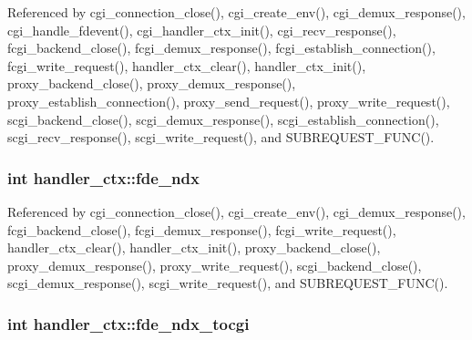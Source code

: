 Referenced by cgi\-\_\-connection\-\_\-close(), cgi\-\_\-create\-\_\-env(), cgi\-\_\-demux\-\_\-response(), cgi\-\_\-handle\-\_\-fdevent(), cgi\-\_\-handler\-\_\-ctx\-\_\-init(), cgi\-\_\-recv\-\_\-response(), fcgi\-\_\-backend\-\_\-close(), fcgi\-\_\-demux\-\_\-response(), fcgi\-\_\-establish\-\_\-connection(), fcgi\-\_\-write\-\_\-request(), handler\-\_\-ctx\-\_\-clear(), handler\-\_\-ctx\-\_\-init(), proxy\-\_\-backend\-\_\-close(), proxy\-\_\-demux\-\_\-response(), proxy\-\_\-establish\-\_\-connection(), proxy\-\_\-send\-\_\-request(), proxy\-\_\-write\-\_\-request(), scgi\-\_\-backend\-\_\-close(), scgi\-\_\-demux\-\_\-response(), scgi\-\_\-establish\-\_\-connection(), scgi\-\_\-recv\-\_\-response(), scgi\-\_\-write\-\_\-request(), and S\-U\-B\-R\-E\-Q\-U\-E\-S\-T\-\_\-\-F\-U\-N\-C().

\hypertarget{structhandler__ctx_a5625d49590c89234b20e0e652f215fa8}{
\subsubsection[{fde\-\_\-ndx}]{\setlength{\rightskip}{0pt plus 5cm}int handler\-\_\-ctx\-::fde\-\_\-ndx}}\label{structhandler__ctx_a5625d49590c89234b20e0e652f215fa8}


Referenced by cgi\-\_\-connection\-\_\-close(), cgi\-\_\-create\-\_\-env(), cgi\-\_\-demux\-\_\-response(), fcgi\-\_\-backend\-\_\-close(), fcgi\-\_\-demux\-\_\-response(), fcgi\-\_\-write\-\_\-request(), handler\-\_\-ctx\-\_\-clear(), handler\-\_\-ctx\-\_\-init(), proxy\-\_\-backend\-\_\-close(), proxy\-\_\-demux\-\_\-response(), proxy\-\_\-write\-\_\-request(), scgi\-\_\-backend\-\_\-close(), scgi\-\_\-demux\-\_\-response(), scgi\-\_\-write\-\_\-request(), and S\-U\-B\-R\-E\-Q\-U\-E\-S\-T\-\_\-\-F\-U\-N\-C().

\hypertarget{structhandler__ctx_a3da16808a01c8c78593b5484347a34f6}{
\subsubsection[{fde\-\_\-ndx\-\_\-tocgi}]{\setlength{\rightskip}{0pt plus 5cm}int handler\-\_\-ctx\-::fde\-\_\-ndx\-\_\-tocgi}}\label{structhandler__ctx_a3da16808a01c8c78593b5484347a34f6}


